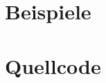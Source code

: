 \documentclass[a4paper,10pt,ngerman]{scrartcl}
\begin{document}
\section{Beispiele}

\section{Quellcode}



\end{document}
